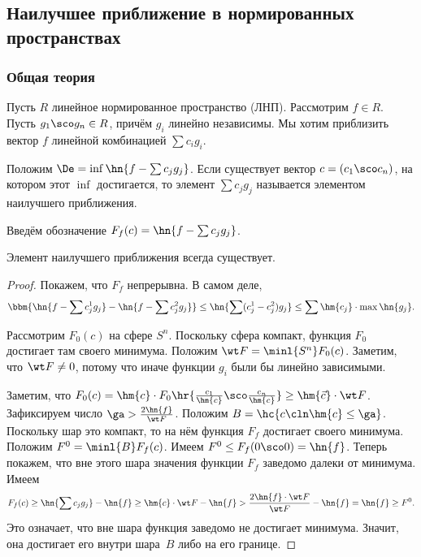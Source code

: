 \documentclass[a4paper]{article}
\begin{document}
\subsection{Наилучшее приближение в нормированных пространствах}

\subsubsection{Общая теория}

Пусть $R$ линейное нормированное пространство (ЛНП). Рассмотрим $f \in
R$.  Пусть $g_1\sco g_n \in R$, причём $g_i$ линейно независимы.  Мы
хотим приблизить вектор $f$ линейной комбинацией $\sum c_i g_i$.

\begin{df}
Положим $\De = \inf \hn{f - \sum c_jg_j}$.  Если существует вектор $c
= (c_1\sco c_n)$, на котором этот $\inf$ достигается, то элемент $\sum
c_j g_j$ называется элементом наилучшего приближения.
\end{df}

Введём обозначение $F_f(c) = \hn{f - \sum c_j g_j}$.

\begin{theorem}
Элемент наилучшего приближения всегда существует.
\end{theorem}
\begin{proof}
Покажем, что $F_f$ непрерывна. В самом деле,
$$\bbm{ \hn{f - \sum c_j^1 g_j} - \hn{f - \sum c_j^2 g_j}} \le
\hn{\sum (c_j^1 - c_j^2) g_j} \le \sum \hm{c_j} \cdot \max \hn{g_j}.$$

Рассмотрим $F_0(c)$ на сфере $S^n$. Поскольку сфера компакт, функция
$F_0$ достигает там своего минимума. Положим $\wt F = \minl{S^n}
F_0(c)$. Заметим, что $\wt F \neq 0$, потому что иначе функции $g_i$
были бы линейно зависимыми.

Заметим, что $F_0(c) = \hm{c} \cdot F_0\hr{\frac{c_1}{\hm{c}}\sco
  \frac{c_n}{\hm{c}}} \ge \hm{\vec c} \cdot \wt F$.  Зафиксируем число
$\ga > \frac{2 \hn{f}}{\wt F}$. Положим $B = \hc{c\cln \hm{c} \le
  \ga}$.  Поскольку шар это компакт, то на нём функция $F_f$ достигает
своего минимума.  Положим $F^0 = \minl{B} F_f(c)$.  Имеем $F^0 \le
F_f(0\sco 0) = \hn{f}$.  Теперь покажем, что вне этого шара значения
функции $F_f$ заведомо далеки от минимума.  Имеем $$F_f(c) \ge
\hn{\sum c_j g_j}- \hn{f} \ge \hm{c} \cdot \wt F - \hn{f} >
\frac{2\hn{f}\cdot \wt F}{\wt F} - \hn{f} = \hn{f} \ge F^0.$$ Это
означает, что вне шара функция заведомо не достигает минимума. Значит,
она достигает его внутри шара~$B$ либо на его границе.
\end{proof}
\end{document}
